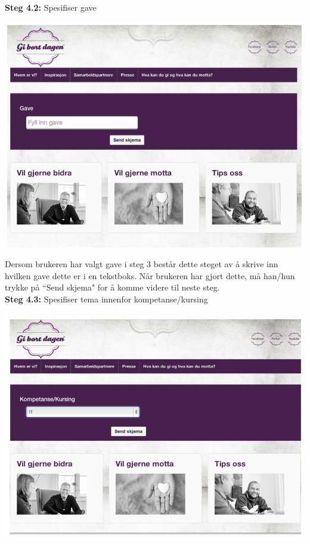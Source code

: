 {\bf Steg 4.2:} Spesifiser gave
\begin{center}
\includegraphics[clip=true, width=1 \textwidth,
trim=0cm 0cm 0cm 0cm]{gave.png}
\label{fig:gave}
\end{center}
Dersom brukeren har valgt gave i steg 3 består dette steget av å skrive inn hvilken gave dette er i en tekstboks. Når brukeren har gjort dette, må han/hun trykke på ``Send skjema" for å komme videre til neste steg.\\

{\bf Steg 4.3:} Spesifiser tema innenfor kompetanse/kursing
\begin{center}
\includegraphics[clip=true, width=1 \textwidth,
trim=0cm 0cm 0cm 0cm]{kompetanse.png}
\label{fig:kompetanse}
\end{center}


